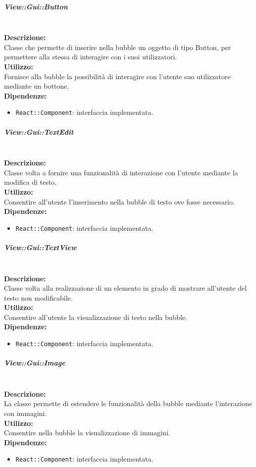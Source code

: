 \subparagraph{View\-::Gui\-::Button}\label{gui-button}\mbox{}\\
\textbf{Descrizione:}\\
Classe che permette di inserire nella bubble un oggetto di tipo Button, per permettere alla stessa di interagire con i suoi utilizzatori.\\
\textbf{Utilizzo:}\\
Fornisce alla bubble la possibilità di interagire con l'utente suo utilizzatore mediante un bottone.\\
\textbf{Dipendenze:}
\begin{itemize}
	\item \texttt{React::Component}: interfaccia implementata.
\end{itemize}

\subparagraph{View\-::Gui\-::Text\-Edit}\label{gui-tedit}\mbox{}\\
\textbf{Descrizione:}\\
Classe volta a fornire una funzionalità di interazione con l'utente mediante la modifica di testo.\\
\textbf{Utilizzo:}\\
Consentire all'utente l'inserimento nella bubble di testo ove fosse necessario.\\
\textbf{Dipendenze:}
\begin{itemize}
	\item \texttt{React::Component}: interfaccia implementata.
\end{itemize}

\subparagraph{View\-::Gui\-::Text\-View}\label{gui-tview}\mbox{}\\
\textbf{Descrizione:}\\
Classe volta alla realizzazione di un elemento in grado di mostrare all'utente del testo non modificabile.\\
\textbf{Utilizzo:}\\
Consentire all'utente la visualizzazione di testo nella bubble.\\
\textbf{Dipendenze:}
\begin{itemize}
	\item \texttt{React::Component}: interfaccia implementata.
\end{itemize}

\subparagraph{View\-::Gui\-::Image}\label{gui-image}\mbox{}\\
\textbf{Descrizione:}\\
La classe permette di estendere le funzionalità della bubble mediante l'interazione con immagini.\\
\textbf{Utilizzo:}\\
Consentire nella bubble la visualizzazione di immagini.\\
\textbf{Dipendenze:}
\begin{itemize}
	\item \texttt{React::Component}: interfaccia implementata.
\end{itemize}

